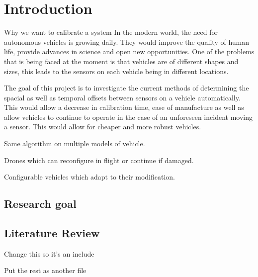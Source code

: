 \documentclass[12pt]{article}
\begin{document}
\newpage
\tableofcontents
\pagebreak


\section{Introduction}

Why we want to calibrate a system
In the modern world, the need for autonomous vehicles is growing daily. They would improve the quality of human life, provide advances in science and open new opportunities. One of the problems that is being faced at the moment is that vehicles are of different shapes and sizes, this leads to the sensors on each vehicle being in different locations. 

The goal of this project is to investigate the current methods of determining the spacial as well as temporal offsets between sensors on a vehicle automatically. This would allow a decrease in calibration time, ease of manufacture as well as allow vehicles to continue to operate in the case of an unforeseen incident moving a sensor. 
This would allow for cheaper and more robust vehicles.


Same algorithm on multiple models of vehicle. 

Drones which can reconfigure in flight or continue if damaged.

Configurable vehicles which adapt to their modification.


\subsection{Research goal}


\subsection{Literature Review}

Change this so it's an include

Put the rest as another file 
    
\end{document}
